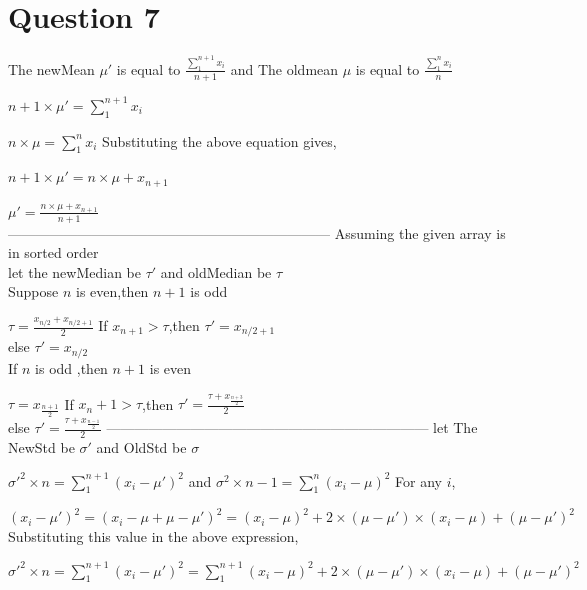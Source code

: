 \documentclass{article}
\begin{document}
\section*{Question 7}
    The newMean $\mu'$ is equal to $\frac{\sum_1^{n+1} x_i}{n+1}$ and
    The oldmean $\mu$ is equal to $\frac{\sum_1^{n} x_i}{n} $
    \par 
    ${n+1} \times \mu' = \sum_1^{n+1} x_i$
    \par 
    $n \times \mu = \sum_1^{n} x_i$
    Substituting the above equation gives,
    \par 
    ${n+1} \times \mu' = n \times \mu + x_{n+1}$
    \par 
    $\mu' = \frac{n\times\mu+x_{n+1}}{n+1}$\\
    \newline
    ---------------------------------------------------------------------
    \newline
    Assuming the given array is in sorted order\\
    let the newMedian be $\tau'$ and oldMedian be $\tau$\\
    Suppose $n$ is even,then $n+1$ is odd\par 
    $\tau = \frac{x_{n/2}+x_{n/2+1}}{2}$\newline
    If $x_{n+1} > \tau$,then $\tau' = x_{n/2+1}$\\
    else $\tau' = x_{n/2}$\\
    If $n$ is odd ,then $n+1$ is even\par 
    $\tau = x_{\frac{n+1}{2}}$\newline 
    If $x_n+1 > \tau$,then $\tau' = \frac{\tau+x_{\frac{n+3}{2}}}{2}$\\
    else $\tau' = \frac{\tau+x_{\frac{n-1}{2}}}{2}$
    \newline
    ---------------------------------------------------------------------
    \newline
    let The NewStd be $\sigma'$ and OldStd be $\sigma$ 
    \par 
    $\sigma'^2 \times n = \sum_1^{n+1} {(x_i-\mu')}^2$ and $\sigma^2 \times {n-1} = \sum_1^{n} {(x_i-\mu)}^2$
    \newline 
    For any $i$,
    \par
    ${(x_i-\mu')}^2={(x_i-\mu+\mu-\mu')}^2={(x_i-\mu)}^2+2\times{(\mu-\mu')}\times{(x_i-\mu)}+{(\mu-\mu')}^2$
    \newline
    Substituting this value in the above expression,
    \par
    $\sigma'^2 \times n = \sum_1^{n+1} {(x_i-\mu')}^2 = \sum_1^{n+1} {(x_i-\mu)}^2+2\times{(\mu-\mu')}\times{(x_i-\mu)}+{(\mu-\mu')}^2 $
\end{document}
